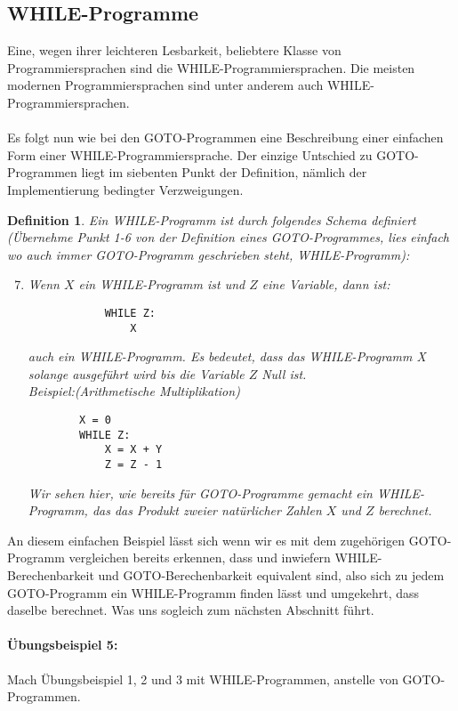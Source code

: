 \documentclass[11pt,a4paper,leqno]{report}
\newtheorem{definition}[theorem]{Definition}
\numberwithin{equation}{chapter}
\begin{document}
\subsection{WHILE-Programme}
Eine, wegen ihrer leichteren Lesbarkeit, beliebtere Klasse von Programmiersprachen sind die WHILE-Programmiersprachen. Die meisten modernen Programmiersprachen sind unter anderem auch WHILE-Programmiersprachen.\\
\\
Es folgt nun wie bei den GOTO-Programmen eine Beschreibung einer einfachen Form einer WHILE-Programmiersprache. Der einzige Untschied zu GOTO-Programmen liegt im siebenten Punkt der Definition, nämlich der Implementierung bedingter Verzweigungen.
\begin{definition}
	Ein WHILE-Programm ist durch folgendes Schema definiert (Übernehme Punkt 1-6 von der Definition eines GOTO-Programmes, lies einfach wo auch immer GOTO-Programm geschrieben steht, WHILE-Programm):
	\begin{enumerate}
 		\setcounter{enumi}{6}
		\item Wenn $X$ ein WHILE-Programm ist und $Z$ eine Variable, dann ist: 
		\begin{lstlisting}
			WHILE Z:
			    X
		\end{lstlisting}
		auch ein WHILE-Programm. Es bedeutet, dass das WHILE-Programm X solange ausgeführt wird bis die Variable $Z$ Null ist.\\
		Beispiel:(Arithmetische Multiplikation)
		\begin{lstlisting}
		X = 0
		WHILE Z:
		    X = X + Y
		    Z = Z - 1
		\end{lstlisting}	
		Wir sehen hier, wie bereits für GOTO-Programme gemacht ein WHILE-Programm, das das Produkt zweier natürlicher Zahlen $X$ und $Z$ berechnet. 
	\end{enumerate}
\end{definition}
An diesem einfachen Beispiel lässt sich wenn wir es mit dem zugehörigen GOTO-Programm vergleichen bereits erkennen, dass und inwiefern WHILE-Berechenbarkeit und GOTO-Berechenbarkeit equivalent sind, also sich zu jedem GOTO-Programm ein WHILE-Programm finden lässt und umgekehrt, dass daselbe berechnet. Was uns sogleich zum nächsten Abschnitt führt.

\paragraph{Übungsbeispiel 5:} Mach Übungsbeispiel 1, 2 und 3 mit WHILE-Programmen, anstelle von GOTO-Programmen.
\end{document}
